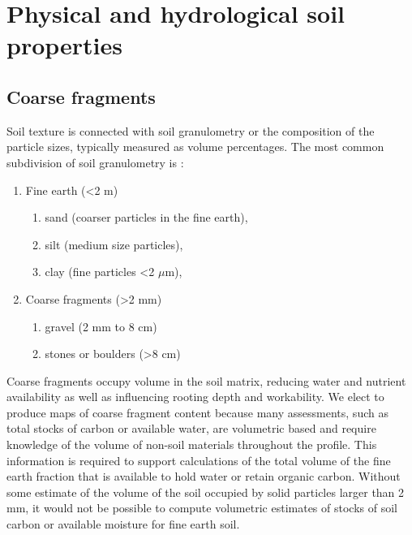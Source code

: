 \documentclass[graybox,natbib,nospthms,UStrade]{svmono}
\begin{document}
\hypertarget{physical-and-hydrological-soil-properties}{%
\section{Physical and hydrological soil properties}\label{physical-and-hydrological-soil-properties}}

\hypertarget{coarse-fragments}{%
\subsection{Coarse fragments}\label{coarse-fragments}}

Soil texture is connected with soil granulometry or the composition of
the particle sizes, typically measured as volume percentages. The most
common subdivision of soil granulometry is \citep{Shirazi2001SSSAJ}:

\begin{enumerate}
\def\labelenumi{\arabic{enumi}.}
\item
  Fine earth (\textless{}2 m)

  \begin{enumerate}
  \def\labelenumii{\arabic{enumii}.}
  \item
    sand (coarser particles in the fine earth),
  \item
    silt (medium size particles),
  \item
    clay (fine particles \textless{}2 \(\mu\)m),
  \end{enumerate}
\item
  Coarse fragments (\textgreater{}2 mm)

  \begin{enumerate}
  \def\labelenumii{\arabic{enumii}.}
  \item
    gravel (2 mm to 8 cm)
  \item
    stones or boulders (\textgreater{}8 cm)
  \end{enumerate}
\end{enumerate}

Coarse fragments occupy volume in the soil matrix, reducing water and
nutrient availability as well as influencing rooting depth and
workability. We elect to produce maps of coarse fragment content because many assessments, such as total stocks of carbon or
available water, are volumetric based and require knowledge of the
volume of non-soil materials throughout the profile. This information is required to support
calculations of the total volume of the fine earth fraction that is
available to hold water or retain organic carbon. Without some estimate
of the volume of the soil occupied by solid particles larger than 2 mm, it
would not be possible to compute volumetric estimates of stocks of soil
carbon or available moisture for fine earth soil.
\end{document}
